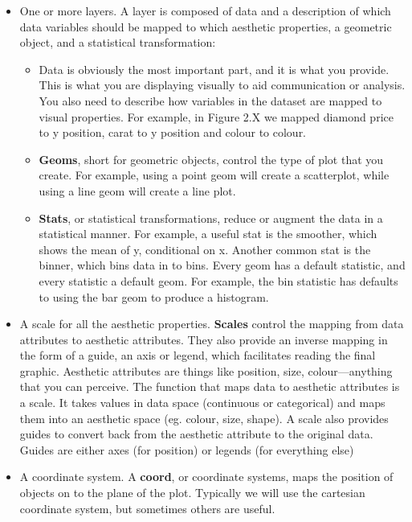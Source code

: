 \begin{itemize}
  \item One or more layers.  A layer is composed of data and a description of which data variables should be mapped to which aesthetic properties, a geometric object, and a statistical transformation:
  
  \begin{itemize}
  	\item Data is obviously the most important part, and it is what you provide.  This is what you are displaying visually to aid communication or analysis.  You also need to describe how variables in the dataset are mapped to visual properties.  For example, in Figure 2.X we mapped diamond price to y position, carat to y position and colour to colour.
  	
  	\item {\bf Geoms}, short for geometric objects, control the type of plot that you create.  For example, using a point geom will create a scatterplot, while using a line geom will create a line plot.

  	\item {\bf Stats}, or statistical transformations, reduce or augment the data in a statistical manner.  For example, a useful stat is the smoother, which shows the mean of y, conditional on x.  Another common stat is the binner, which bins data in to bins.   Every geom has a default statistic, and every statistic a default geom.  For example, the bin statistic has defaults to using the bar geom to produce a histogram.
  \end{itemize}

  \item A scale for all the aesthetic properties.  {\bf Scales} control the mapping from data attributes to aesthetic attributes.  They also provide an inverse mapping in the form of a guide, an axis or legend, which facilitates reading the final graphic.  Aesthetic attributes are things like position, size, colour---anything that you can perceive.  The function that maps data to aesthetic attributes is a scale. It takes values in data space (continuous or categorical) and maps them into an aesthetic space (eg. colour, size, shape).  A scale also provides guides to convert back from the aesthetic attribute to the original data.  Guides are either axes (for position) or legends (for everything else)

  \item A coordinate system.  A {\bf coord}, or coordinate systems, maps the position of objects on to the plane of the plot.  Typically we will use the cartesian coordinate system, but sometimes others are useful.
\end{itemize}

